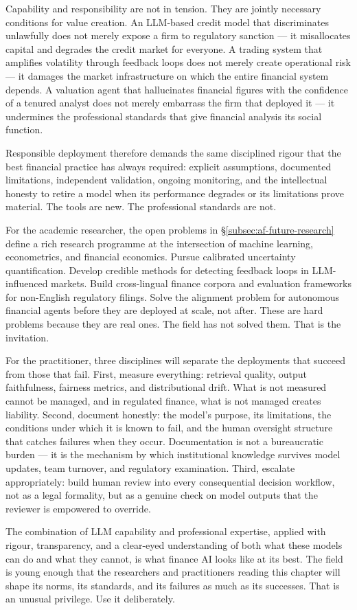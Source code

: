 \begin{context}
Capability and responsibility are not in tension. They are jointly necessary conditions for value creation. An LLM-based credit model that discriminates unlawfully does not merely expose a firm to regulatory sanction — it misallocates capital and degrades the credit market for everyone. A trading system that amplifies volatility through feedback loops does not merely create operational risk — it damages the market infrastructure on which the entire financial system depends. A valuation agent that hallucinates financial figures with the confidence of a tenured analyst does not merely embarrass the firm that deployed it — it undermines the professional standards that give financial analysis its social function.

Responsible deployment therefore demands the same disciplined rigour that the best financial practice has always required: explicit assumptions, documented limitations, independent validation, ongoing monitoring, and the intellectual honesty to retire a model when its performance degrades or its limitations prove material. The tools are new. The professional standards are not.

For the academic researcher, the open problems in \S\ref{subsec:af-future-research} define a rich research programme at the intersection of machine learning, econometrics, and financial economics. Pursue calibrated uncertainty quantification. Develop credible methods for detecting feedback loops in LLM-influenced markets. Build cross-lingual finance corpora and evaluation frameworks for non-English regulatory filings. Solve the alignment problem for autonomous financial agents before they are deployed at scale, not after. These are hard problems because they are real ones. The field has not solved them. That is the invitation.

For the practitioner, three disciplines will separate the deployments that succeed from those that fail. First, measure everything: retrieval quality, output faithfulness, fairness metrics, and distributional drift. What is not measured cannot be managed, and in regulated finance, what is not managed creates liability. Second, document honestly: the model's purpose, its limitations, the conditions under which it is known to fail, and the human oversight structure that catches failures when they occur. Documentation is not a bureaucratic burden — it is the mechanism by which institutional knowledge survives model updates, team turnover, and regulatory examination. Third, escalate appropriately: build human review into every consequential decision workflow, not as a legal formality, but as a genuine check on model outputs that the reviewer is empowered to override.

The combination of LLM capability and professional expertise, applied with rigour, transparency, and a clear-eyed understanding of both what these models can do and what they cannot, is what finance AI looks like at its best. The field is young enough that the researchers and practitioners reading this chapter will shape its norms, its standards, and its failures as much as its successes. That is an unusual privilege. Use it deliberately.

\end{context}

